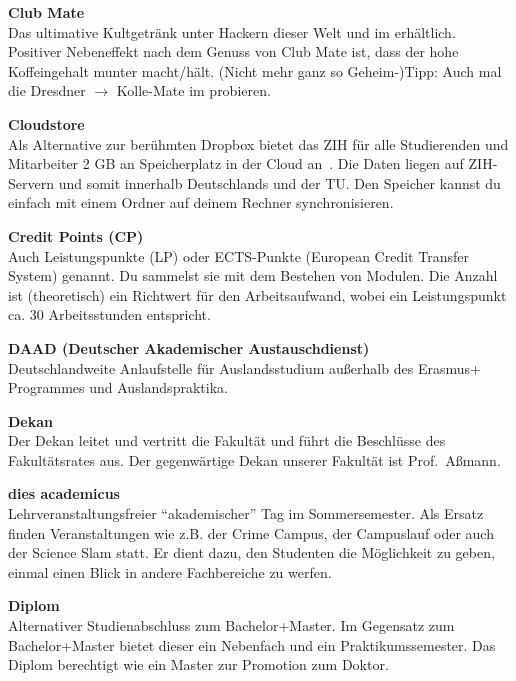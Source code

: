 \begin{multicols}{2}
\textbf{Club Mate} \\
Das ultimative Kultgetränk unter Hackern dieser Welt und im \ascii{} erhältlich.
Positiver Nebeneffekt nach dem Genuss von Club Mate ist, dass der hohe Koffeingehalt munter macht/hält.
(Nicht mehr ganz so Geheim-)Tipp:
Auch mal die Dresdner $\rightarrow$ Kolle-Mate im \ascii{} probieren.

\textbf{Cloudstore} \\
Als Alternative zur berühmten Dropbox bietet das ZIH für alle Studierenden und Mitarbeiter 2 GB an Speicherplatz in der Cloud an~.
Die Daten liegen auf ZIH-Servern und somit innerhalb Deutschlands und der TU\@.
Den Speicher kannst du einfach mit einem Ordner auf deinem Rechner synchronisieren.



\textbf{Credit Points (CP)} \\
Auch Leistungspunkte (LP) oder ECTS-Punkte (European Credit Transfer System) genannt. Du sammelst sie mit dem Bestehen von Modulen.
Die Anzahl ist (theoretisch) ein Richtwert für den Arbeitsaufwand, wobei ein Leistungspunkt ca. 30 Arbeitsstunden entspricht.

\textbf{DAAD (Deutscher Akademischer Austauschdienst)} \\
Deutschlandweite Anlaufstelle für Auslandsstudium außerhalb des Erasmus+ Programmes und Auslands\-praktika.

\textbf{Dekan} \\
Der Dekan leitet und vertritt die Fakultät und führt die Beschlüsse des Fakultätsrates aus.
Der gegenwärtige Dekan unserer Fakultät ist Prof.\ Aßmann.

\textbf{dies academicus} \\
Lehrveranstaltungsfreier \enquote {akademischer} Tag im Sommersemester.
Als Ersatz finden Veranstaltungen wie z.B. der Crime Campus, der Campuslauf oder auch der Science Slam statt.
Er dient dazu, den Studenten die Möglichkeit zu geben, einmal einen Blick in andere Fachbereiche zu werfen.~

\textbf{Diplom} \\
Alternativer Studienabschluss zum Bachelor+Master.
Im Gegensatz zum Bachelor+Master bietet dieser ein Nebenfach und ein Praktikumssemester.
Das Diplom berechtigt wie ein Master zur Promotion zum Doktor.


\end{multicols}
